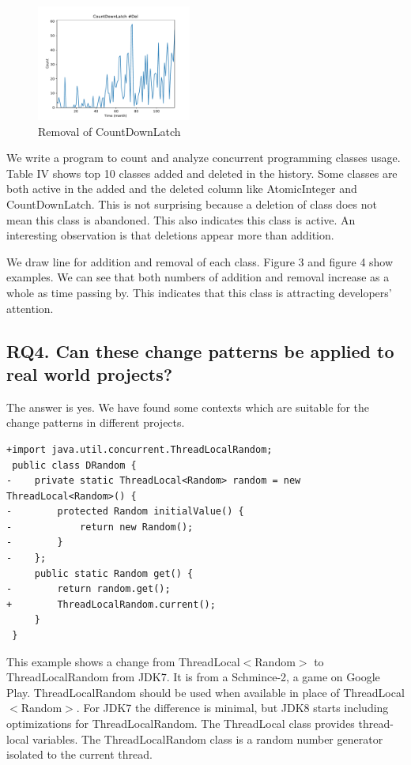 \begin{figure}
	\centering
	\includegraphics[height=1.5in]{CountDownLatchMinus}
	\caption{Removal of CountDownLatch}
\end{figure}

We write a program to count and analyze concurrent programming classes usage. Table IV shows top 10 classes added and deleted in the history. Some classes are both active in the added and the deleted column like AtomicInteger and CountDownLatch. This is not surprising because a deletion of class does not mean this class is abandoned. This also indicates this class is active. An interesting observation is that deletions appear more than addition.

We draw line for addition and removal of each class. Figure 3 and figure 4 show examples. We can see that both numbers of addition and removal increase as a whole as time passing by. This indicates that this class is attracting developers' attention.

\subsection{RQ4. Can these change patterns be applied to real world projects?}

The answer is yes. We have found some contexts which are suitable for the change patterns in different projects.

\begin{lstlisting}
+import java.util.concurrent.ThreadLocalRandom;
 public class DRandom {
-    private static ThreadLocal<Random> random = new ThreadLocal<Random>() {
-        protected Random initialValue() {
-            return new Random();
-        }
-    };
     public static Random get() {
-        return random.get();
+        ThreadLocalRandom.current();
     }
 }
\end{lstlisting}

This example shows a change from ThreadLocal$<$Random$>$ to ThreadLocalRandom from JDK7. It is from a Schmince-2, a game on Google Play. ThreadLocalRandom should be used when available in place of ThreadLocal$<$Random$>$. For JDK7 the difference is minimal, but JDK8 starts including optimizations for ThreadLocalRandom. The ThreadLocal class provides thread-local variables. The ThreadLocalRandom class is a random number generator isolated to the current thread.
 